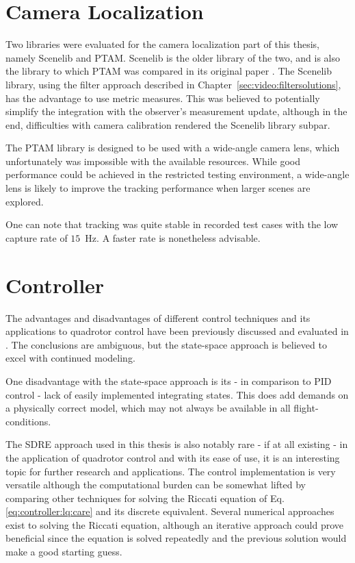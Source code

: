     \section{Camera Localization}
    \label{sec:discussion:cameralocalization}
        Two libraries were evaluated for the camera localization part of this thesis,
        namely Scenelib and PTAM. Scenelib is the older library of the two,
        and is also the library to which PTAM was compared in its original paper \citep{klein07parallel}.
        The Scenelib library, using the filter approach described in Chapter~\ref{sec:video:filtersolutions},
        has the advantage to use metric measures.
        This was believed to potentially simplify the integration with the
        observer's measurement update, although in the end, difficulties
        with camera calibration rendered the Scenelib library subpar.

        The PTAM library is designed to be used with a wide-angle camera lens,
        which unfortunately was impossible with the available resources.
        While good performance could be achieved in the restricted testing
        environment, a wide-angle lens is likely to improve the tracking
        performance when larger scenes are explored.

        One can note that tracking was quite stable in recorded test cases
        with the low capture rate of $15$~Hz. A faster rate is nonetheless advisable.

    \section{Controller}
        The advantages and disadvantages of different control techniques
        and its applications to quadrotor control
        have been previously discussed and evaluated in \citep{bouabdallah04pid}.
        The conclusions are ambiguous, but the state-space approach is believed to
        excel with continued modeling.

        One disadvantage with the state-space approach is its - in comparison
        to PID control - lack of easily implemented integrating states.
        This does add demands on a physically correct model, which may
        not always be available in all flight-conditions.

        The SDRE approach used in this thesis is also notably rare - if at
        all existing - in the application of quadrotor control
        and with its ease of use, it is an interesting topic for further research and applications.
        The control implementation is very versatile although the computational
        burden can be somewhat lifted by comparing other techniques for solving
        the Riccati equation of Eq. \ref{eq:controller:lq:care} and its discrete equivalent.
        Several numerical approaches exist to solving the Riccati equation,
        although an iterative approach could prove beneficial since
        the equation is solved repeatedly and the previous solution would make a
        good starting guess.

